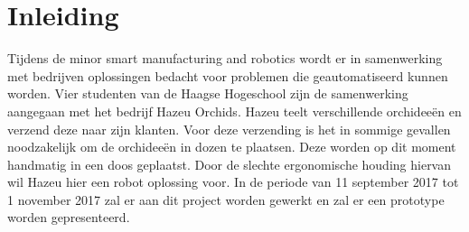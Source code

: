 
\section{Inleiding}

Tijdens de minor smart manufacturing and robotics wordt er in samenwerking met bedrijven oplossingen bedacht voor problemen die geautomatiseerd kunnen worden. Vier studenten van de Haagse Hogeschool zijn de samenwerking aangegaan met het bedrijf Hazeu Orchids. Hazeu teelt verschillende orchideeën en verzend deze naar zijn klanten. Voor deze verzending is het in sommige gevallen noodzakelijk om de orchideeën in dozen te plaatsen. Deze worden op dit moment handmatig in een doos geplaatst. Door de slechte ergonomische houding hiervan wil Hazeu hier een robot oplossing voor. In de periode van 11 september 2017 tot 1 november 2017 zal er aan dit project worden gewerkt en zal er een prototype worden gepresenteerd.

\newpage
